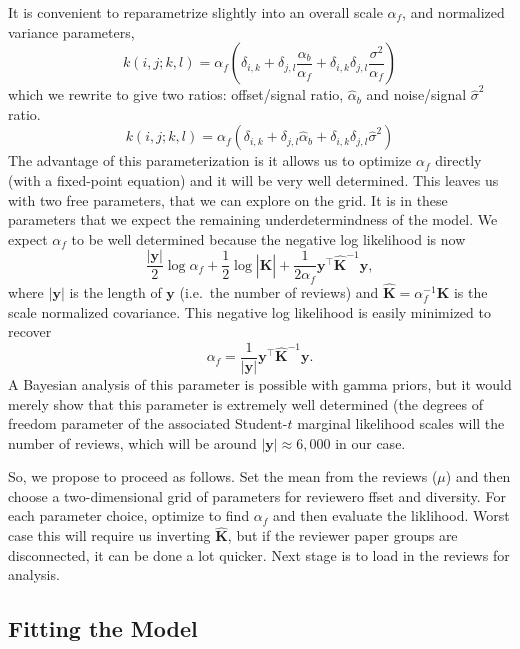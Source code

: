 It is convenient to reparametrize slightly into an overall scale
\(\alpha_f\), and normalized variance parameters, \[
k(i,j; k,l) = \alpha_f\left(\delta_{i,k}  + \delta_{j,l} \frac{\alpha_b}{\alpha_f} + \delta_{i, k}\delta_{j,l} \frac{\sigma^2}{\alpha_f}\right)
\] which we rewrite to give two ratios: offset/signal ratio,
\(\hat{\alpha}_b\) and noise/signal \(\hat{\sigma}^2\) ratio. \[
k(i,j; k,l) = \alpha_f\left(\delta_{i,k}  + \delta_{j,l} \hat{\alpha}_b + \delta_{i, k}\delta_{j,l} \hat{\sigma}^2\right)
\] The advantage of this parameterization is it allows us to optimize
\(\alpha_f\) directly (with a fixed-point equation) and it will be very
well determined. This leaves us with two free parameters, that we can
explore on the grid. It is in these parameters that we expect the
remaining underdetermindness of the model. We expect \(\alpha_f\) to be
well determined because the negative log likelihood is now \[
\frac{|\mathbf{y}|}{2}\log\alpha_f + \frac{1}{2}\log  \left|\hat{\mathbf{K}}\right| + \frac{1}{2\alpha_f}\mathbf{y}^\top \hat{\mathbf{K}}^{-1} \mathbf{y},
\] where \(|\mathbf{y}|\) is the length of \(\mathbf{y}\) (i.e.~the
number of reviews) and \(\hat{\mathbf{K}}=\alpha_f^{-1}\mathbf{K}\) is
the scale normalized covariance. This negative log likelihood is easily
minimized to recover \[
\alpha_f = \frac{1}{|\mathbf{y}|} \mathbf{y}^\top \hat{\mathbf{K}}^{-1} \mathbf{y}.
\] A Bayesian analysis of this parameter is possible with gamma priors,
but it would merely show that this parameter is extremely well
determined (the degrees of freedom parameter of the associated
Student-\(t\) marginal likelihood scales will the number of reviews,
which will be around \(|\mathbf{y}| \approx 6,000\) in our case.

So, we propose to proceed as follows. Set the mean from the reviews
(\(\mu\)) and then choose a two-dimensional grid of parameters for
reviewero ffset and diversity. For each parameter choice, optimize to
find \(\alpha_f\) and then evaluate the liklihood. Worst case this will
require us inverting \(\hat{\mathbf{K}}\), but if the reviewer paper
groups are disconnected, it can be done a lot quicker. Next stage is to
load in the reviews for analysis.

\hypertarget{fitting-the-model}{%
\subsection{Fitting the Model}\label{fitting-the-model}}

\begin{flushright}
\end{flushright}

